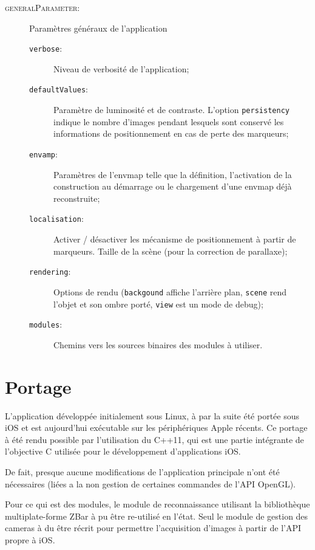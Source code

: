 \documentclass[10pt,a4paper,twoside, twocolumn]{report}
\begin{document}
\begin{description}
	\item[\textsc{generalParameter}:]		Paramètres généraux de l'application
		\begin{description}
			\item[\texttt{verbose}:]				Niveau de verbosité de l'application;
			\item[\texttt{defaultValues}:]	Paramètre de luminosité et de contraste. L’option \texttt{persistency} indique le nombre d'images pendant lesquels sont conservé les informations de positionnement en cas de perte des marqueurs;
			\item[\texttt{envamp}:]					Paramètres de l'envmap telle que la définition, l'activation de la construction au démarrage ou le chargement d'une envmap déjà reconstruite;
			\item[\texttt{localisation}:]		Activer / désactiver les mécanisme de positionnement à partir de marqueurs. Taille de la scène (pour la correction de parallaxe);
			\item[\texttt{rendering}:]			Options de rendu (\texttt{backgound} affiche l’arrière plan, \texttt{scene} rend l'objet et son ombre porté, \texttt{view} est un mode de debug);
			\item[\texttt{modules}:]				Chemins vers les sources binaires des modules à utiliser.
		\end{description}
		
\end{description}




\section{Portage}

L'application développée initialement sous Linux, à par la suite été portée sous iOS et est aujourd'hui exécutable sur les périphériques Apple récents. Ce portage à été rendu possible par l'utilisation du C++11, qui est une partie intégrante de l'objective C utilisée pour le développement d'applications iOS.

De fait, presque aucune modifications de l'application principale n'ont été nécessaires (liées a la non gestion de certaines commandes de l'API OpenGL).

Pour ce qui est des modules, le module de reconnaissance utilisant la bibliothèque multiplate-forme ZBar à pu être re-utilisé en l'état. Seul le module de gestion des cameras à du être récrit pour permettre l’acquisition d'images à partir de l'API propre à iOS.
\end{document}
